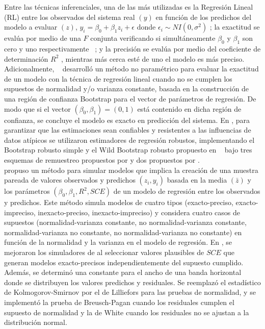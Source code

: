 Entre las técnicas inferenciales, una de las más utilizadas es la Regresión Lineal (RL) entre los observados del sistema real $ (y) $ en función de los predichos del modelo a evaluar $ (z) $, $ y_{i} = \beta_{0} + \beta_{1}z_{i} +\epsilon $  donde $ \epsilon_{i} \sim NI(0,\sigma^{2}) $ ; la exactitud se evalúa por medio de una $ F $ conjunta verificando si simultáneamente $ \beta_{0} $ y $ \beta_{1} $ son cero y uno respectivamente ~\parencites{yang-2004,tedeschi-2006,montgomery-2012}; y la precisión se evalúa por medio del coeficiente de determinación $ R^{2} $ \parencite{balam-2012}, mientras más cerca esté de uno el modelo es más preciso.
Adicionalmente, ~\textcite{zacarias-2023} desarrolló un método no paramétrico para evaluar la exactitud de un modelo con la técnica de regresión lineal cuando no se cumplen los supuestos de normalidad y/o varianza constante, basada en la construcción de una región de confianza Bootstrap para el vector de parámetros de regresión. De modo que si el vector  $ (\beta_{0},\beta_{1})=(0,1) $ está contenido en dicha región de confianza, se concluye el modelo es exacto en predicción del sistema. En \textcite{zacarias-2023}, para garantizar que las estimaciones sean confiables y resistentes a las influencias de datos atípicos se utilizaron estimadores de regresión robustos, implementando el Bootstrap robusto simple y el Wild Bootstrap robusto propuesto en ~\textcite{rana-2012} bajo tres esquemas de remuestreo propuestos por \textcite{wu-1986} y dos propuestos por \textcite{liu-1988}.\\

\textcite{febles-2014} propuso un método para simular modelos que implica la creación de una muestra pareada de valores observados y predichos $ (z_{i},y_{i}) $ basada en la media $ (\bar{z}) $ y los parámetros $ (\beta_{0}, \beta_{1}, R^{2}, SCE) $ de un modelo de regresión entre los observados y predichos. Este método simula modelos de cuatro tipos (exacto-preciso, exacto-impreciso, inexacto-preciso, inexacto-impreciso) y considera cuatro casos de supuestos (normalidad-varianza constante, no normalidad-varianza constante, normalidad-varianza no constante, no normalidad-varianza no constante) en función de la normalidad y la varianza en el modelo de regresión. En \textcite{zacarias-2023}, se mejoraron los simuladores de \textcite{febles-2014} al seleccionar valores plausibles de $ SCE $ que generan modelos exacto-precisos independientemente del supuesto cumplido. Además, se determinó una constante para el ancho de una banda horizontal donde se distribuyen los valores predichos y residuales. Se reemplazó el estadístico de Kolmogorov-Smirnov por el de Lilliefors para las pruebas de normalidad, y se implementó la prueba de Breusch-Pagan cuando los residuales cumplen el supuesto de normalidad y la de White cuando los residuales no se ajustan a la distribución normal.\\

